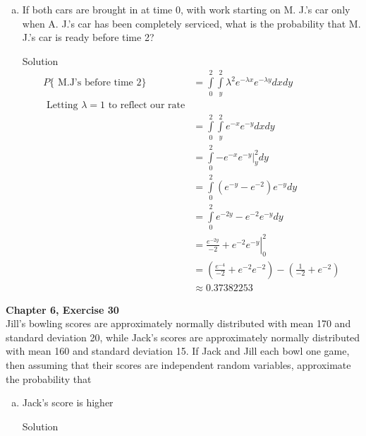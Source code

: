 \documentclass{article}
\begin{document}
\begin{spacing}{1.1}
\begin{homeworkProblem}
\begin{enumerate}[(a)]
\begin{homeworkSection}{Solution}
        Now considering the probability that M.J.'s car will be serviced at a time $> t$,
        by the memorylessness of the exponential we find the the probability is $\frac{ 1}{2}$

        Putting everything together, we find that the probability M.J.'s car is serviced before
        A.J's car is
        \begin{align*}
          P\{ \text{ M.J's care is serviced before A.J.'s car} \} &= \frac{ 1}{ 2} - (1 - e^{-t})\\
          &= e^{-t} - \frac{ 1}{ 2}
        \end{align*}
      \end{homeworkSection}
    \item If both cars are brought in at time 0, with work 
    starting on M. J.'s car only when A. J.'s car has been 
    completely serviced, what is the probability that M. J.'s 
    car is ready before time 2?
      \begin{homeworkSection}{Solution}
        \begin{align*}
          P\{ \text{ M.J's before time 2}\} 
          &= \int\limits_0^2 \int\limits_y^2 \lambda^2 e^{-\lambda x} e^{-\lambda y} dx dy\\
            \text{ Letting $\lambda = 1$ to reflect our rate}\\
          &= \int\limits_0^2 \int\limits_y^2 e^{-x} e^{-y} dx dy\\
          &= \int\limits_0^2 \left.-e^{-x} e^{-y}\right|_y^2 dy\\
          &= \int\limits_0^2 (e^{-y} - e^{-2}) e^{-y} dy\\
          &= \int\limits_0^2 e^{-2y} - e^{-2} e^{-y} dy\\
          &= \left.\frac{ e^{-2y}}{ -2} + e^{-2} e^{-y}\right|_0^2\\
          &= \left(\frac{ e^{-4}}{ -2} + e^{-2} e^{-2}\right) 
            - \left(\frac{ 1}{ -2} + e^{-2}\right)\\
          &\approx 0.37382253
        \end{align*}
      \end{homeworkSection}
  \end{enumerate}
\end{homeworkProblem}

\newpage
\begin{homeworkProblem}
  {\bf Chapter 6, Exercise 30}\\
  Jill's bowling scores are approximately normally distributed with 
  mean 170 and standard deviation 20, while Jack's scores are 
  approximately normally distributed with mean 160 and standard 
  deviation 15. If Jack and Jill each bowl one game, then assuming 
  that their scores are independent random variables, approximate 
  the probability that
  \begin{enumerate}[(a)]
    \item Jack's score is higher
      \begin{homeworkSection}{Solution}
        

\end{homeworkSection}
\end{enumerate}
\end{homeworkProblem}
\end{spacing}
\end{document}
